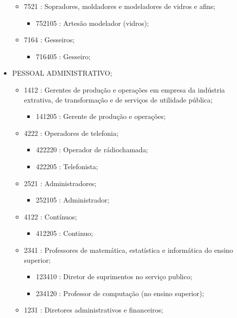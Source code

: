 \begin{itemize}
\begin{itemize}
    \item 7521 : Sopradores, moldadores e modeladores de vidros e afins;
    \begin{itemize}
      \item 752105 : Artesão modelador (vidros);
    \end{itemize}
    \item 7164 : Gesseiros;
    \begin{itemize}
      \item 716405 : Gesseiro;
    \end{itemize}
  \end{itemize}
  \item PESSOAL ADMINISTRATIVO;
  \begin{itemize}
    \item 1412 : Gerentes de produção e operações em empresa da indústria extrativa, de transformação e de serviços de utilidade pública;
    \begin{itemize}
      \item 141205 : Gerente de produção e operações;
    \end{itemize}
    \item 4222 : Operadores de telefonia;
    \begin{itemize}
      \item 422220 : Operador de rádiochamada;
      \item 422205 : Telefonista;
    \end{itemize}
    \item 2521 : Administradores;
    \begin{itemize}
      \item 252105 : Administrador;
    \end{itemize}
    \item 4122 : Contínuos;
    \begin{itemize}
      \item 412205 : Continuo;
    \end{itemize}
    \item 2341 : Professores de matemática, estatística e informática do ensino superior;
    \begin{itemize}
      \item 123410 : Diretor de suprimentos no serviço publico;
      \item 234120 : Professor de computação (no ensino superior);
    \end{itemize}
    \item 1231 : Diretores administrativos e financeiros;
    \begin{itemize}

\end{itemize}
\end{itemize}
\end{itemize}
